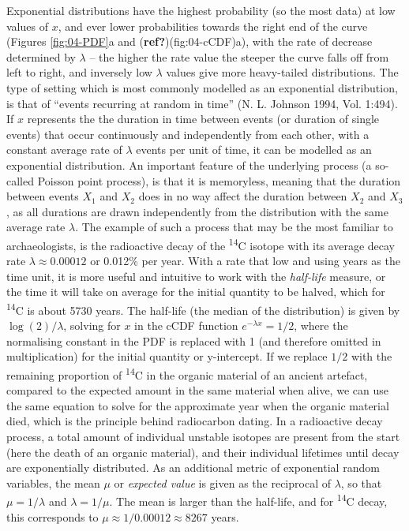 \documentclass[
  12pt,
  a4paper, twoside]{book}
\begin{document}
Exponential distributions have the highest probability (so the most data) at low values of \(x\), and ever lower probabilities towards the right end of the curve (Figures \ref{fig:04-PDF}a and (\textbf{ref?})(fig:04-cCDF)a), with the rate of decrease determined by \(\lambda\) -- the higher the rate value the steeper the curve falls off from left to right, and inversely low \(\lambda\) values give more heavy-tailed distributions. The type of setting which is most commonly modelled as an exponential distribution, is that of ``events recurring at random in time'' (N. L. Johnson 1994, Vol. 1:494). If \(x\) represents the the duration in time between events (or duration of single events) that occur continuously and independently from each other, with a constant average rate of \(\lambda\) events per unit of time, it can be modelled as an exponential distribution. An important feature of the underlying process (a so-called Poisson point process), is that it is memoryless, meaning that the duration between events \(X_1\) and \(X_2\) does in no way affect the duration between \(X_2\) and \(X_3\), as all durations are drawn independently from the distribution with the same average rate \(\lambda\). The example of such a process that may be the most familiar to archaeologists, is the radioactive decay of the \textsuperscript{14}C isotope with its average decay rate \(\lambda \approx 0.00012\) or 0.012\% per year. With a rate that low and using years as the time unit, it is more useful and intuitive to work with the \emph{half-life} measure, or the time it will take on average for the initial quantity to be halved, which for \textsuperscript{14}C is about 5730 years. The half-life (the median of the distribution) is given by \(\log (2)/\lambda\), solving for \(x\) in the cCDF function \(e^{-\lambda x} = 1/2\), where the normalising constant in the PDF is replaced with 1 (and therefore omitted in multiplication) for the initial quantity or y-intercept. If we replace \(1/2\) with the remaining proportion of \textsuperscript{14}C in the organic material of an ancient artefact, compared to the expected amount in the same material when alive, we can use the same equation to solve for the approximate year when the organic material died, which is the principle behind radiocarbon dating. In a radioactive decay process, a total amount of individual unstable isotopes are present from the start (here the death of an organic material), and their individual lifetimes until decay are exponentially distributed. As an additional metric of exponential random variables, the mean \(\mu\) or \emph{expected value} is given as the reciprocal of \(\lambda\), so that \(\mu = 1/\lambda\) and \(\lambda = 1/\mu\). The mean is larger than the half-life, and for \textsuperscript{14}C decay, this corresponds to \(\mu \approx 1/0.00012 \approx 8267\) years.
\end{document}
